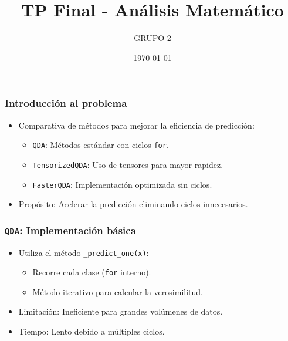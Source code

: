 \documentclass{beamer}
\title{TP Final - Análisis Matemático}
\author{GRUPO 2}
\date{\today}
\begin{document}


    
\begin{frame}
  \frametitle{Introducción al problema}

  \begin{itemize}
    \item Comparativa de métodos para mejorar la eficiencia de predicción:
    \begin{itemize}
      \item \texttt{QDA}: Métodos estándar con ciclos \texttt{for}.
      \item \texttt{TensorizedQDA}: Uso de tensores para mayor rapidez.
      \item \texttt{FasterQDA}: Implementación optimizada sin ciclos.
    \end{itemize}
    \item Propósito: Acelerar la predicción eliminando ciclos innecesarios.
  \end{itemize}

\end{frame}

\begin{frame}
  \frametitle{\texttt{QDA}: Implementación básica}

  \begin{itemize}
    \item Utiliza el método \texttt{\_predict\_one(x)}:
    \begin{itemize}
      \item Recorre cada clase (\texttt{for} interno).
      \item Método iterativo para calcular la verosimilitud.
    \end{itemize}
    \item Limitación: Ineficiente para grandes volúmenes de datos.
    \item Tiempo: Lento debido a múltiples ciclos.
  \end{itemize}

\end{frame}
\end{document}
